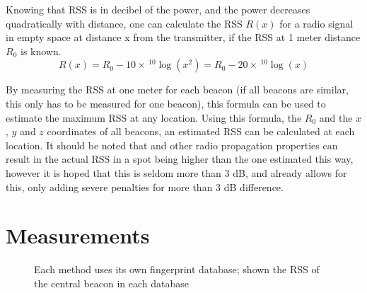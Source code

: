 Knowing that RSS is in decibel of the power, and the power decreases quadratically with distance, one can calculate the RSS $R(x)$ for a radio signal in empty space at distance x from the transmitter, if the RSS at 1 meter distance $R_0$ is known.
\begin{equation}
    R(x) = R_0 - 10 \times \, ^{10}\log(x^2) = R_0 - 20 \times \, ^{10}\log(x)
\end{equation}

By measuring the RSS at one meter for each beacon (if all beacons are similar, this only has to be measured for one beacon), this formula can be used to estimate the maximum RSS at any location.
Using this formula, the $R_0$ and the $x$, $y$ and $z$ coordinates of all beacons, an estimated RSS can be calculated at each location.
It should be noted that \mpp and other radio propagation properties can result in the actual RSS in a spot being higher than the one estimated this way, however it is hoped that this is seldom more than 3 dB, and  already allows for this, only adding severe penalties for more than 3 dB difference.

\section{Measurements}
\begin{figure}[p]
    \begin{subfigure}[b]{0.5\textwidth}
    \end{subfigure}
    \begin{subfigure}[b]{0.5\textwidth}
    \end{subfigure}
    \begin{subfigure}[b]{0.5\textwidth}
    \end{subfigure}
    \begin{subfigure}[b]{0.5\textwidth}
    \end{subfigure}
    \begin{subfigure}[b]{0.5\textwidth}
    \end{subfigure}
    \begin{subfigure}[b]{0.5\textwidth}
    \end{subfigure}
    \caption{Each method uses its own fingerprint database; shown the RSS of the central beacon in each database}
    \label{fig:architecture-heatmaps}
\end{figure}

